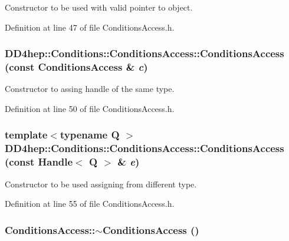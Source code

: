 Constructor to be used with valid pointer to object. 

Definition at line 47 of file ConditionsAccess.h.\hypertarget{class_d_d4hep_1_1_conditions_1_1_conditions_access_a39e09b1816f8a9e0cfc63815356a44fb}{
\subsubsection[{ConditionsAccess}]{\setlength{\rightskip}{0pt plus 5cm}DD4hep::Conditions::ConditionsAccess::ConditionsAccess (const {\bf ConditionsAccess} \& {\em c})}}
\label{class_d_d4hep_1_1_conditions_1_1_conditions_access_a39e09b1816f8a9e0cfc63815356a44fb}


Constructor to assing handle of the same type. 

Definition at line 50 of file ConditionsAccess.h.\hypertarget{class_d_d4hep_1_1_conditions_1_1_conditions_access_a117b108aa0675602a50b8b9a4dd3292d}{
\subsubsection[{ConditionsAccess}]{\setlength{\rightskip}{0pt plus 5cm}template$<$typename Q $>$ DD4hep::Conditions::ConditionsAccess::ConditionsAccess (const {\bf Handle}$<$ Q $>$ \& {\em e})}}
\label{class_d_d4hep_1_1_conditions_1_1_conditions_access_a117b108aa0675602a50b8b9a4dd3292d}


Constructor to be used assigning from different type. 

Definition at line 55 of file ConditionsAccess.h.\hypertarget{class_d_d4hep_1_1_conditions_1_1_conditions_access_ab654b88bad13706fd78d4a92c1ba0eb4}{
\subsubsection[{$\sim$ConditionsAccess}]{\setlength{\rightskip}{0pt plus 5cm}ConditionsAccess::$\sim$ConditionsAccess ()}}
\label{class_d_d4hep_1_1_conditions_1_1_conditions_access_ab654b88bad13706fd78d4a92c1ba0eb4}


